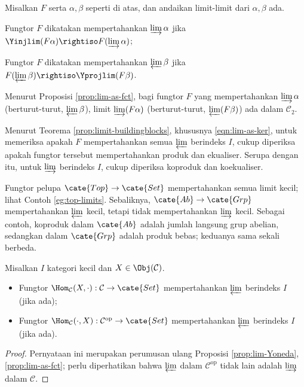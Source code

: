 \begin{definition}\label{def:preservation-limit}
	Misalkan $F$ serta $\alpha, \beta$ seperti di atas, dan andaikan limit-limit dari $\alpha, \beta$ ada.
	\begin{compactitem}
		\item Fungtor $F$ dikatakan mempertahankan $\varinjlim \alpha$ jika $\Yinjlim (F\alpha) \rightiso F (\varinjlim \alpha)$;
		\item Fungtor $F$ dikatakan mempertahankan $\varprojlim \beta$ jika $F(\varprojlim \beta) \rightiso \Yprojlim (F\beta)$.
	\end{compactitem}
\end{definition}
Menurut Proposisi \ref{prop:lim-as-fct}, bagi fungtor $F$ yang mempertahankan $\varinjlim \alpha$ (berturut-turut, $\varprojlim \beta$), limit $\varinjlim (F\alpha)$ (berturut-turut, $\varprojlim (F\beta)$) ada dalam $\mathcal{C}_2$.

\begin{remark}\label{rem:preservation-limit}
	Menurut Teorema \ref{prop:limit-buildingblocks}, khususnya \eqref{eqn:lim-as-ker}, untuk memeriksa apakah $F$ mempertahankan semua $\varprojlim$ berindeks $I$, cukup diperiksa apakah fungtor tersebut mempertahankan produk dan ekualiser. Serupa dengan itu, untuk $\varinjlim$ berindeks $I$, cukup diperiksa koproduk dan koekualiser.
\end{remark}

\begin{example}\label{eg:preservation-limit}
	Fungtor pelupa $\cate{Top} \to \cate{Set}$ mempertahankan semua limit kecil; lihat Contoh \ref{eg:top-limits}. Sebaliknya, $\cate{Ab} \to \cate{Grp}$ mempertahankan $\varprojlim$ kecil, tetapi tidak mempertahankan $\varinjlim$ kecil. Sebagai contoh, koproduk dalam $\cate{Ab}$ adalah jumlah langsung grup abelian, sedangkan dalam $\cate{Grp}$ adalah produk bebas; keduanya sama sekali berbeda.
\end{example}

\begin{proposition}\label{prop:Hom-exact}
	Misalkan $I$ kategori kecil dan $X \in \Obj(\mathcal{C})$.
	\begin{itemize}
		\item Fungtor $\Hom_{\mathcal{C}}(X, \cdot): \mathcal{C} \to \cate{Set}$ mempertahankan $\varprojlim$ berindeks $I$ (jika ada);
		\item Fungtor $\Hom_{\mathcal{C}}(\cdot, X): \mathcal{C}^\text{op} \to \cate{Set}$	mempertahankan $\varprojlim$ berindeks $I$ (jika ada).
	\end{itemize}
\end{proposition}
\begin{proof}
	Pernyataan ini merupakan perumusan ulang Proposisi \ref{prop:lim-Yoneda}, \ref{prop:lim-as-fct}; perlu diperhatikan bahwa $\varprojlim$ dalam $\mathcal{C}^\text{op}$ tidak lain adalah $\varinjlim$ dalam $\mathcal{C}$.
\end{proof}

